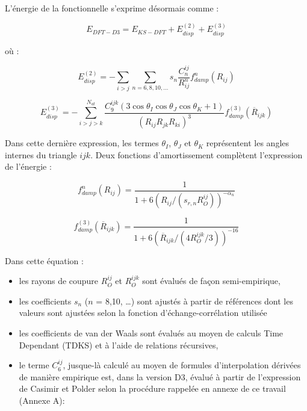 {	L'énergie de la fonctionnelle s’exprime désormais comme :
	
	\begin{equation}
	E_{DFT-D3} = E_{KS-DFT} + E_{disp}^{(2)} + E_{disp}^{(3)}
	\end{equation}
	
	où : 
	
	\begin{equation}
	E_{disp}^{(2)}=- \sum_{i>j} \sum_{n=6,8,10,…} s_{n} \frac{C_{n}^{ij}}{R_{ij}^{n}} f_{damp}^{n} (R_{ij})
	\end{equation}
	
	\begin{equation}
	E_{disp}^{(3)}= -\sum_{i>j>k}^{N_{at}} \frac{C_{9}^{ijk}(3\cos\theta_{I}\cos\theta_{J}\cos\theta_{K}+ 1)}{(R_{ij} R_{jk} R_{ki})^{3}} f_{damp}^{(3)} (\overline{R}_{ijk})
	\end{equation}
	
	Dans cette dernière expression, les termes $\theta_{I}$, $\theta_{J}$ et $\theta_{K}$ représentent les angles internes du triangle $ijk$. Deux fonctions d'amortissement complètent l’expression de l’énergie :
	
		\begin{equation} f_{damp}^{n} (R_{ij}) =\frac{1}{1+6(R_{ij} / (s_{r,n} R_{O}^{ij}))^{-\alpha_{n}}} \end{equation}  
		  
		\begin{equation} f_{damp}^{(3)} (\overline{R}_{ijk}) =\frac{1}{1+6(\overline{R}_{ijk} / (4 R_{O}^{ijk}/3))^{-16}}\end{equation}

	
	Dans cette équation : 
	\begin{itemize}
	\item les rayons de coupure $R_{O}^{ij}$ et $R_{O}^{ijk}$ sont évalués de façon semi-empirique,
	\item les coefficients $s_{n}$ ($n$ = 8,10, \dots) sont ajustés à partir de références dont les valeurs sont ajustées selon la fonction d’échange-corrélation utilisée
	\item les coefficients de van der Waals sont évalués au moyen de calculs Time Dependant (TDKS) et à l’aide de relations récursives,
	\item le terme $C_{6}^{ij}$, jusque-là calculé au moyen de formules d’interpolation dérivées de manière empirique est, dans la version D3, évalué à partir de l’expression de Casimir et Polder selon la procédure rappelée en annexe de ce travail (Annexe A): 
	\end{itemize}
	
}
